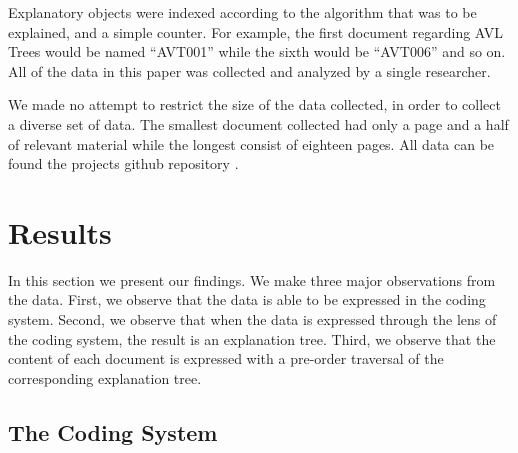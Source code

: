 \documentclass[sigconf]{acmart}
\begin{document}
Explanatory objects were indexed according to the algorithm that was to be
explained, and a simple counter. For example, the first document regarding AVL
Trees would be named ``AVT001'' while the sixth would be ``AVT006'' and so on.
All of the data in this paper was collected and analyzed by a single researcher.

We made no attempt to restrict the size of the data collected, in order to
collect a diverse set of data. The smallest document collected had only a page
and a half of relevant material while the longest consist of eighteen pages. All
data can be found the projects github repository .

\section{Results}
In this section we present our findings. We make three major observations from
the data. First, we observe that the data is able to be expressed in the coding
system. Second, we observe that when the data is expressed through the lens of
the coding system, the result is an explanation tree. Third, we observe that
the content of each document is expressed with a pre-order traversal of the
corresponding explanation tree.

\subsection{The Coding System}
\label{sec:res:sys}
\end{document}
